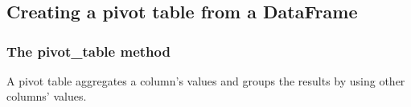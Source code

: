 \chapter{\label{Ch08}}
\section{Creating a pivot table from a DataFrame}
\subsection{The pivot\_table method}
A pivot table aggregates a column’s values and groups the results by using other columns’ values.